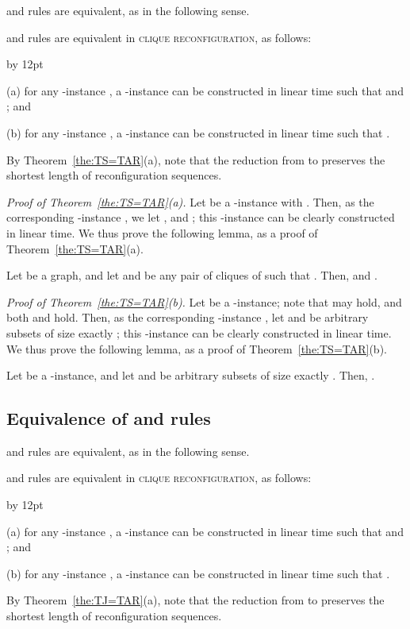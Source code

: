 \documentclass{llncs}
\newenvironment{listing}[1]{\begin{list}{*}{\settowidth{\labelwidth}{#1}\setlength{\leftmargin}{\labelwidth}\advance \leftmargin by 12pt
\setlength{\itemsep}{0pt}\setlength{\parsep}{0pt}\setlength{\topsep}{0pt}\setlength{\parskip}{0pt}}}{\end{list}}
\begin{document}
 and  rules are equivalent, as in the following sense.
	\begin{theorem} \label{the:TS=TAR}
	 and  rules are equivalent in \textsc{clique reconfiguration}, as follows{\rm :} 
		\begin{listing}{aaa}
		\item[{\rm (}a{\rm )}] for any -instance , a -instance  can be constructed in linear time such that   and {\rm ;} and
		\item[{\rm (}b{\rm )}] for any -instance , a -instance  can be constructed in linear time such that .
		\end{listing}
	\end{theorem}
	By Theorem~\ref{the:TS=TAR}(a), note that the reduction from  to  preserves the shortest length of reconfiguration sequences.
\medskip

	\noindent
	{\em Proof of Theorem~{\rm \ref{the:TS=TAR}(}a{\rm )}.}
	Let  be a -instance with .
	Then, as the corresponding -instance , we let ,  and ;
this -instance can be clearly constructed in linear time.
	We thus prove the following lemma, as a proof of Theorem~\ref{the:TS=TAR}(a).
	\begin{lemma} \label{lem:TS->TAR}
	Let  be a graph, and let  and  be any pair of cliques of  such that .
	Then,  and .
	\end{lemma}

	\noindent
	{\em Proof of Theorem~{\rm \ref{the:TS=TAR}(}b{\rm )}.}
	Let  be a -instance; 
note that  may hold, and both  and  hold.
	Then, as the corresponding -instance , let  and  be arbitrary subsets of size exactly ;
this -instance can be clearly constructed in linear time.
	We thus prove the following lemma, as a proof of Theorem~\ref{the:TS=TAR}(b).
	\begin{lemma} \label{lem:TS=TARb}
	Let  be a -instance, and let  and  be arbitrary subsets of size exactly .
	Then, .
	\end{lemma}

\subsection{Equivalence of  and  rules} 

 and  rules are equivalent, as in the following sense.
	\begin{theorem} \label{the:TJ=TAR}
	 and  rules are equivalent in \textsc{clique reconfiguration}, as follows{\rm :} 
		\begin{listing}{aaa}
		\item[{\rm (}a{\rm )}] for any -instance , a -instance  can be constructed in linear time such that   and {\rm ;} and
		\item[{\rm (}b{\rm )}] for any -instance , a -instance  can be constructed in linear time such that .
		\end{listing}
	\end{theorem}
	By Theorem~\ref{the:TJ=TAR}(a), note that the reduction from  to  preserves the shortest length of reconfiguration sequences.
\medskip
\end{document}
